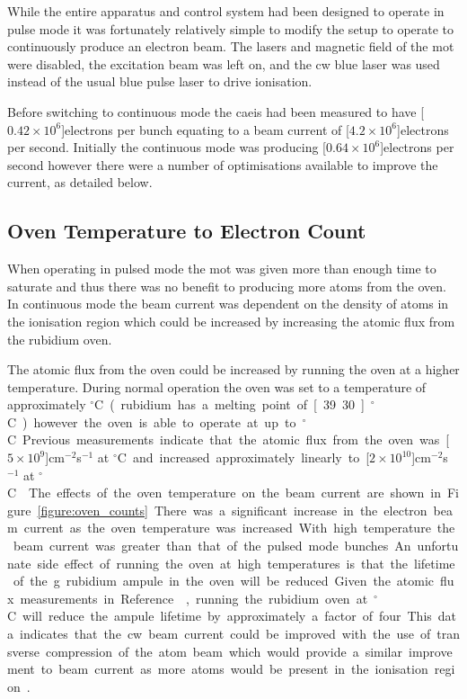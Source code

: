 While the entire apparatus and control system had been designed to operate in pulse mode it was fortunately relatively simple to modify the setup to operate to continuously produce an electron beam.
The lasers and magnetic field of the \gls{mot} were disabled, the excitation beam was left on, and the \gls{cw} blue laser was used instead of the usual blue pulse laser to drive ionisation.

Before switching to continuous mode the \gls{caeis} had been measured to have \unit[$0.42\times10^6$]{electrons per bunch} equating to a beam current of \unit[$4.2\times10^6$]{electrons per second}.
Initially the continuous mode was producing \unit[$0.64\times10^6$]{electrons per second} however there were a number of optimisations available to improve the current, as detailed below.

\subsection{Oven Temperature to Electron Count}
When operating in pulsed mode the \gls{mot} was given more than enough time to saturate and thus there was no benefit to producing more atoms from the oven.
In continuous mode the beam current was dependent on the density of atoms in the ionisation region which could be increased by increasing the atomic flux from the rubidium oven.

The atomic flux from the oven could be increased by running the oven at a higher temperature.
During normal operation the oven was set to a temperature of approximately \unit[80]{$^\circ$C} (rubidium has a melting point of \unit[39.30]{$^\circ$C}) however the oven is able to operate at up to \unit[200]{$^\circ$C}.
Previous measurements indicate that the atomic flux from the oven was \unit[$5\times10^9$]{cm$^{-2}$s$^{-1}$} at \unit[80]{$^\circ$C} and increased approximately linearly to \unit[$2\times10^{10}$]{cm$^{-2}$s$^{-1}$} at \unit[200]{$^\circ$C}~\cite{bell_slow_2010}.

The effects of the oven temperature on the beam current are shown in Figure~\ref{figure:oven_counts}.
There was a significant increase in the electron beam current as the oven temperature was increased.
With high temperature the beam current was greater than that of the pulsed mode bunches.
An unfortunate side effect of running the oven at high temperatures is that the lifetime of the \unit[5]{g} rubidium ampule in the oven will be reduced.
Given the atomic flux measurements in Reference~\cite{bell_slow_2010}, running the rubidium oven at \unit[200]{$^\circ$C} will reduce the ampule lifetime by approximately a factor of four.
This data indicates that the \gls{cw} beam current could be improved with the use of transverse compression of the atom beam which would provide a similar improvement to beam current as more atoms would be present in the ionisation region~\cite{tielen_development_2015}.

